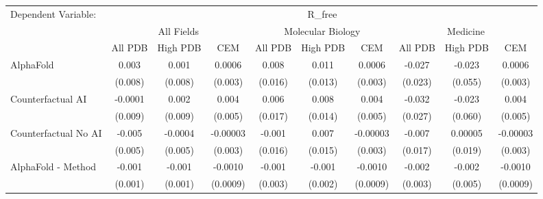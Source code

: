 \begingroup
\centering
\begin{tabular}{lccccccccc}
   \tabularnewline \midrule \midrule
   Dependent Variable: & \multicolumn{9}{c}{R\_free}\\
 & \multicolumn{3}{c}{All Fields} & \multicolumn{3}{c}{Molecular Biology} & \multicolumn{3}{c}{Medicine} \\
\cmidrule(lr){2-7} \cmidrule(lr){5-10} \cmidrule(lr){8-7}
 & \multicolumn{1}{c}{All PDB} & \multicolumn{1}{c}{High PDB} & \multicolumn{1}{c}{CEM} & \multicolumn{1}{c}{All PDB} & \multicolumn{1}{c}{High PDB} & \multicolumn{1}{c}{CEM} & \multicolumn{1}{c}{All PDB} & \multicolumn{1}{c}{High PDB} & \multicolumn{1}{c}{CEM} \\
\cmidrule(lr){2-3} \cmidrule(lr){3-4} \cmidrule(lr){4-5} \cmidrule(lr){5-6} \cmidrule(lr){6-7} \cmidrule(lr){7-8} \cmidrule(lr){8-9} \cmidrule(lr){9-10} \cmidrule(lr){10-3}
   AlphaFold                                                   & 0.003       & 0.001         & 0.0006        & 0.008    & 0.011      & 0.0006        & -0.027        & -0.023        & 0.0006\\   
                                                               & (0.008)     & (0.008)       & (0.003)       & (0.016)  & (0.013)    & (0.003)       & (0.023)       & (0.055)       & (0.003)\\   
   Counterfactual AI                                           & -0.0001     & 0.002         & 0.004         & 0.006    & 0.008      & 0.004         & -0.032        & -0.023        & 0.004\\   
                                                               & (0.009)     & (0.009)       & (0.005)       & (0.017)  & (0.014)    & (0.005)       & (0.027)       & (0.060)       & (0.005)\\   
   Counterfactual No AI                                        & -0.005      & -0.0004       & -0.00003      & -0.001   & 0.007      & -0.00003      & -0.007        & 0.00005       & -0.00003\\   
                                                               & (0.005)     & (0.005)       & (0.003)       & (0.016)  & (0.015)    & (0.003)       & (0.017)       & (0.019)       & (0.003)\\   
   AlphaFold - Method                                          & -0.001      & -0.001        & -0.0010       & -0.001   & -0.001     & -0.0010       & -0.002        & -0.002        & -0.0010\\   
                                                               & (0.001)     & (0.001)       & (0.0009)      & (0.003)  & (0.002)    & (0.0009)      & (0.003)       & (0.005)       & (0.0009)\\   

\end{tabular}
